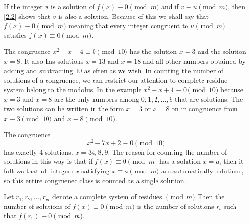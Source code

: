 \documentclass[11pt]{article}
\begin{document}
If the integer \(u\) is a solution of \(f(x) \equiv 0 \pmod{m}\) and if \(v
\equiv u \pmod{m}\), then \cref{2.2} shows that \(v\) is also a
solution. Because of this we shall say that \(f(x) \equiv 0 \pmod{m}\) meaning that every integer congruent to \(u \pmod{m}\) satisfies \(f(x) \equiv 0 \pmod{m}\).
\begin{example}
    The congruence \(x^2 - x + 4 \equiv 0 \pmod{10}\) has the solution \(x = 3\) and the solution \(x = 8\). It also has solutions \(x = 13\) and \(x = 18\) and all other numbers obtained by adding and subtracting 10 as often as we wish. In counting the number of solutions of a congruence, we can restrict our attention to complete residue system belong to the modolus. In the example \(x^2 - x + 4 \equiv 0 \pmod{10}\) because \(x = 3\) and \(x = 8\) are the only numbers among \(0, 1, 2, \ldots, 9\) that are solutions. The two solutions can be written in the form \(x = 3\) or \(x = 8\) on in congruence from \(x \equiv 3 \pmod{10}\) and \(x \equiv 8 \pmod{10}\).
\end{example}

\begin{example}
    The congruence
    \[x^2 - 7x + 2 \equiv 0 \pmod{10}\]
    has exactly 4 solutions, \(x = 3 4, 8, 9\). The reason for counting the number
    of solutions in this way is that if \(f(x) \equiv 0 \pmod{m}\) has a solution
    \(x = a\), then it follows that all integers \(x\) satisfying \(x \equiv a
    \pmod{m}\) are automatically solutions, so this entire congruenec class is
    counted as a single solution.
\end{example}

\begin{definition}
    Let \(r_1, r_2, \ldots, r_m\) denote a complete system of residues \(\pmod{m}\) Then the number of solutions of \(f(x) \equiv 0 \pmod{m}\) is the number of solutions \(r_i\) such that \(f(r_1) \equiv 0 \pmod{m}\).
\end{definition}
\end{document}
